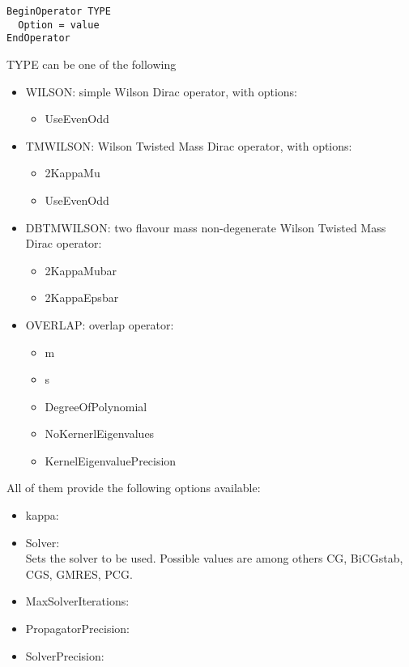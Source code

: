 \begin{verbatim}
BeginOperator TYPE
  Option = value
EndOperator
\end{verbatim}
{\ttfamily TYPE} can be one of the following
\begin{itemize}
\item {\ttfamily WILSON}: simple Wilson Dirac operator, with options:
  \begin{itemize}
  \item {\ttfamily UseEvenOdd}
  \end{itemize}
\item {\ttfamily TMWILSON}: Wilson Twisted Mass Dirac operator, with
  options:
  \begin{itemize}
  \item {\ttfamily 2KappaMu}
  \item {\ttfamily UseEvenOdd}
  \end{itemize}
\item {\ttfamily DBTMWILSON}: two flavour mass non-degenerate Wilson
  Twisted Mass Dirac operator:
  \begin{itemize}
  \item {\ttfamily 2KappaMubar}
  \item {\ttfamily 2KappaEpsbar}
  \end{itemize}
\item {\ttfamily OVERLAP}: overlap  operator:
  \begin{itemize}
  \item {\ttfamily m}
  \item {\ttfamily s}
  \item {\ttfamily DegreeOfPolynomial}
  \item {\ttfamily NoKernerlEigenvalues}
  \item {\ttfamily KernelEigenvaluePrecision}
  \end{itemize}
\end{itemize}
All of them provide the following options available:
\begin{itemize}
\item {\ttfamily kappa}:
\item {\ttfamily Solver}:\\
  Sets the solver to be used. Possible values are among others
  {\ttfamily CG, BiCGstab, CGS, GMRES, PCG}.
\item {\ttfamily MaxSolverIterations}:
\item {\ttfamily PropagatorPrecision}:
\item {\ttfamily SolverPrecision}:
\end{itemize}

